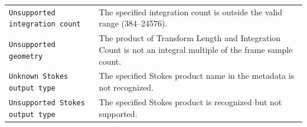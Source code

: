 \begin{longtable}{l p{8cm}}
\texttt{Unsupported integration count}
    & The specified integration count is outside the valid range
      (384--24576). \\

\texttt{Unsupported geometry}
    & The product of Transform Length and Integration Count is not
      an integral multiple of the frame sample count. \\

\texttt{Unknown Stokes output type}
    & The specified Stokes product name in the metadata is not
      recognized. \\

\texttt{Unsupported Stokes output type}
    & The specified Stokes product is recognized but not
      supported. \\

\end{longtable}
